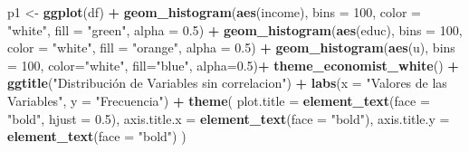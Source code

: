 \documentclass[
]{article}
\newenvironment{Shaded}{\begin{snugshade}}{\end{snugshade}}
\newcommand{\AttributeTok}[1]{\textcolor[rgb]{0.13,0.29,0.53}{#1}}
\newcommand{\DecValTok}[1]{\textcolor[rgb]{0.00,0.00,0.81}{#1}}
\newcommand{\FloatTok}[1]{\textcolor[rgb]{0.00,0.00,0.81}{#1}}
\newcommand{\FunctionTok}[1]{\textcolor[rgb]{0.13,0.29,0.53}{\textbf{#1}}}
\newcommand{\NormalTok}[1]{#1}
\newcommand{\OtherTok}[1]{\textcolor[rgb]{0.56,0.35,0.01}{#1}}
\newcommand{\SpecialCharTok}[1]{\textcolor[rgb]{0.81,0.36,0.00}{\textbf{#1}}}
\newcommand{\StringTok}[1]{\textcolor[rgb]{0.31,0.60,0.02}{#1}}
\begin{document}
\begin{Shaded}
\begin{Highlighting}[]
\NormalTok{p1 }\OtherTok{\textless{}{-}} \FunctionTok{ggplot}\NormalTok{(df) }\SpecialCharTok{+} 
  \FunctionTok{geom\_histogram}\NormalTok{(}\FunctionTok{aes}\NormalTok{(income), }\AttributeTok{bins =} \DecValTok{100}\NormalTok{, }\AttributeTok{color =} \StringTok{"white"}\NormalTok{, }\AttributeTok{fill =} \StringTok{"green"}\NormalTok{, }\AttributeTok{alpha =} \FloatTok{0.5}\NormalTok{) }\SpecialCharTok{+} 
  \FunctionTok{geom\_histogram}\NormalTok{(}\FunctionTok{aes}\NormalTok{(educ), }\AttributeTok{bins =} \DecValTok{100}\NormalTok{, }\AttributeTok{color =} \StringTok{"white"}\NormalTok{, }\AttributeTok{fill =} \StringTok{"orange"}\NormalTok{, }\AttributeTok{alpha =} \FloatTok{0.5}\NormalTok{) }\SpecialCharTok{+}
  \FunctionTok{geom\_histogram}\NormalTok{(}\FunctionTok{aes}\NormalTok{(u), }\AttributeTok{bins =} \DecValTok{100}\NormalTok{, }\AttributeTok{color=}\StringTok{"white"}\NormalTok{, }\AttributeTok{fill=}\StringTok{"blue"}\NormalTok{, }\AttributeTok{alpha=}\FloatTok{0.5}\NormalTok{)}\SpecialCharTok{+}
  \FunctionTok{theme\_economist\_white}\NormalTok{() }\SpecialCharTok{+}
  \FunctionTok{ggtitle}\NormalTok{(}\StringTok{"Distribución de Variables sin correlacion"}\NormalTok{) }\SpecialCharTok{+}
  \FunctionTok{labs}\NormalTok{(}\AttributeTok{x =} \StringTok{"Valores de las Variables"}\NormalTok{, }\AttributeTok{y =} \StringTok{"Frecuencia"}\NormalTok{) }\SpecialCharTok{+} 
  \FunctionTok{theme}\NormalTok{(}
    \AttributeTok{plot.title =} \FunctionTok{element\_text}\NormalTok{(}\AttributeTok{face =} \StringTok{"bold"}\NormalTok{, }\AttributeTok{hjust =} \FloatTok{0.5}\NormalTok{),  }
    \AttributeTok{axis.title.x =} \FunctionTok{element\_text}\NormalTok{(}\AttributeTok{face =} \StringTok{"bold"}\NormalTok{),  }
    \AttributeTok{axis.title.y =} \FunctionTok{element\_text}\NormalTok{(}\AttributeTok{face =} \StringTok{"bold"}\NormalTok{)}
\NormalTok{  )}



\end{Highlighting}
\end{Shaded}
\end{document}
